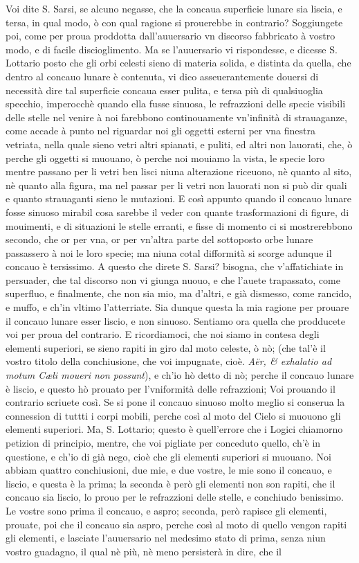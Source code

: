 \documentclass[11pt,twoside,openany]{book}
\begin{document}
Voi dite S. Sarsi, se alcuno negasse, che la concaua superficie lunare sia liscia, e tersa, in qual modo, ò con qual ragione si prouerebbe in contrario? Soggiungete poi, come per proua proddotta dall'auuersario vn discorso fabbricato à vostro modo, e di facile discioglimento. Ma se l'auuersario vi rispondesse, e dicesse S. Lottario posto che gli orbi celesti sieno di materia solida, e distinta da quella, che dentro al concauo lunare è contenuta, vi dico asseuerantemente douersi di necessità dire tal superficie concaua esser pulita, e tersa più di qualsiuoglia specchio, imperocchè quando ella fusse sinuosa, le refrazzioni delle specie visibili delle stelle nel venire à noi farebbono continouamente vn'infinità di strauaganze, come accade à punto nel riguardar noi gli oggetti esterni per vna finestra vetriata, nella quale sieno vetri altri spianati, e puliti, ed altri non lauorati, che, ò perche gli oggetti si muouano, ò perche noi mouiamo la vista, le specie loro mentre passano per li vetri ben lisci niuna alterazione riceuono, nè quanto al sito, nè quanto alla figura, ma nel passar per li vetri non lauorati non si può dir quali e quanto strauaganti sieno le mutazioni. E così appunto quando il concauo lunare fosse sinuoso mirabil cosa sarebbe il veder con quante trasformazioni di figure, di mouimenti, e di situazioni le stelle erranti, e fisse di momento ci si mostrerebbono secondo, che or per vna, or per vn'altra parte del sottoposto orbe lunare passassero à noi le loro specie; ma niuna cotal difformità si scorge adunque il concauo è tersissimo. A questo che direte S. Sarsi? bisogna, che v'affatichiate in persuader, che tal discorso non vi giunga nuouo, e che l'auete trapassato, come superfluo, e finalmente, che non sia mio, ma d'altri, e già dismesso, come rancido, e muffo, e ch'in vltimo l'atterriate. Sia dunque questa la mia ragione per prouare il concauo lunare esser liscio, e non sinuoso. Sentiamo ora quella che prodducete voi per proua del contrario. E ricordiamoci, che noi siamo in contesa degli elementi superiori, se sieno rapiti in giro dal moto celeste, ò nò; (che tal'è il vostro titolo della conchiusione, che voi impugnate, cioè. \textit{Aër, \& exhalatio ad motum Cæli moueri non possunt}), e ch'io hò detto di nò; perche il concauo lunare è liscio, e questo hò prouato per l'vniformità delle refrazzioni; Voi prouando il contrario scriuete così. Se si pone il concauo sinuoso molto meglio si conserua la connession di tuttti i corpi mobili, perche così al moto del Cielo si muouono gli elementi superiori. Ma, S. Lottario; questo è quell'errore che i Logici chiamorno petizion di principio, mentre, che voi pigliate per conceduto quello, ch'è in questione, e ch'io di già nego, cioè che gli elementi superiori si muouano. Noi abbiam quattro conchiusioni, due mie, e due vostre, le mie sono il concauo, e liscio, e questa è la prima; la seconda è però gli elementi non son rapiti, che il concauo sia liscio, lo prouo per le refrazzioni delle stelle, e conchiudo benissimo. Le vostre sono prima il concauo, e aspro; seconda, però rapisce gli elementi, prouate, poi che il concauo sia aspro, perche così al moto di quello vengon rapiti gli elementi, e lasciate l'auuersario nel medesimo stato di prima, senza niun vostro guadagno, il qual nè più, nè meno persisterà in dire, che il 
\end{document}
